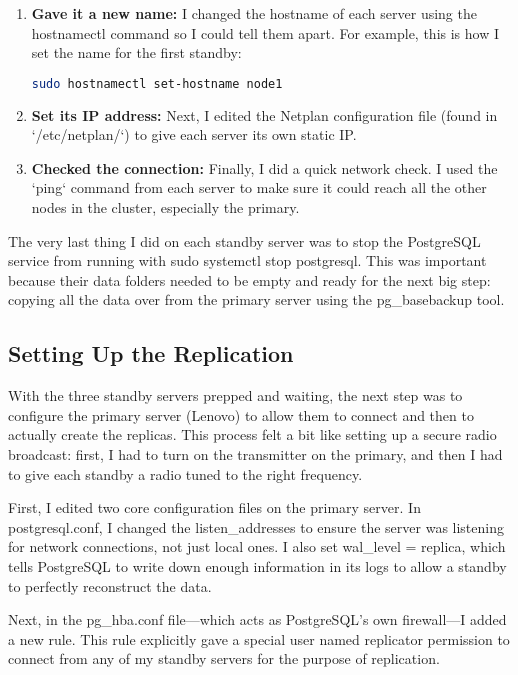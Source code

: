 \documentclass[conference]{IEEEtran}
\begin{document}
\begin{enumerate}
\item \textbf{Gave it a new name:} I changed the hostname of each server using the hostnamectl command so I could tell them apart. For example, this is how I set the name for the first standby:
\begin{lstlisting}[language=bash, caption={Setting the hostname for node1}]
sudo hostnamectl set-hostname node1
\end{lstlisting}

\item \textbf{Set its IP address:} Next, I edited the Netplan configuration file (found in `/etc/netplan/`) to give each server its own static IP.

\item \textbf{Checked the connection:} Finally, I did a quick network check. I used the `ping` command from each server to make sure it could reach all the other nodes in the cluster, especially the primary.

\end{enumerate}

The very last thing I did on each standby server was to stop the PostgreSQL service from running with sudo systemctl stop postgresql. This was important because their data folders needed to be empty and ready for the next big step: copying all the data over from the primary server using the pg\_basebackup tool.


\subsection{Setting Up the Replication}
With the three standby servers prepped and waiting, the next step was to configure the primary server (Lenovo) to allow them to connect and then to actually create the replicas. This process felt a bit like setting up a secure radio broadcast: first, I had to turn on the transmitter on the primary, and then I had to give each standby a radio tuned to the right frequency.

First, I edited two core configuration files on the primary server. In postgresql.conf, I changed the listen\_addresses to ensure the server was listening for network connections, not just local ones. I also set wal\_level = replica, which tells PostgreSQL to write down enough information in its logs to allow a standby to perfectly reconstruct the data.

Next, in the pg\_hba.conf file—which acts as PostgreSQL's own firewall—I added a new rule. This rule explicitly gave a special user named replicator permission to connect from any of my standby servers for the purpose of replication.
\end{document}
